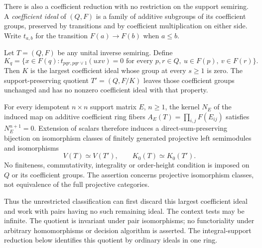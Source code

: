 There is also a coefficient reduction with no restriction on the support
semiring. A \emph{coefficient ideal} of $(Q,F)$ is a family of additive
subgroups of its coefficient groups, preserved by transitions and by
coefficient multiplication on either side. Write $t_{a,b}$ for the
transition $F(a)\to F(b)$ when $a\leq b$.

\begin{theorem}
\label{thm:upper-unit-quotient}
Let $T=(Q,F)$ be any unital inverse semiring. Define
\[
 K_q=\{x\in F(q):t_{pqr,pqr\vee1}(uxv)=0
 \text{ for every }p,r\in Q,\ u\in F(p),\ v\in F(r)\}.
\]
Then $K$ is the largest coefficient ideal whose group at every
$s\geq1$ is zero. The support-preserving quotient
$T'=(Q,F/K)$ leaves those coefficient groups unchanged and has no
nonzero coefficient ideal with that property.

For every idempotent $n\times n$ support matrix $E$, $n\geq1$, the
kernel $N_E$ of the induced map on additive coefficient ring fibers
$A_E(T)=\prod_{i,j}F(E_{ij})$
satisfies $N_E^{n+1}=0$. Extension of scalars therefore induces a
direct-sum-preserving bijection on isomorphism classes of finitely
generated projective left semimodules and isomorphisms
\[
 V(T)\simeq V(T'),\qquad K_0(T)\simeq K_0(T').
\]
No finiteness, commutativity, integrality or order-height condition is
imposed on $Q$ or its coefficient groups. The assertion concerns
projective isomorphism classes, not equivalence of the full projective
categories.
\end{theorem}

Thus the unrestricted classification can first discard this largest
coefficient ideal and work with pairs having no such remaining ideal.
The context tests may be infinite. The quotient is invariant under
pair isomorphisms; no functoriality under arbitrary homomorphisms or
decision algorithm is asserted. The integral-support reduction below
identifies this quotient by ordinary ideals in one ring.
